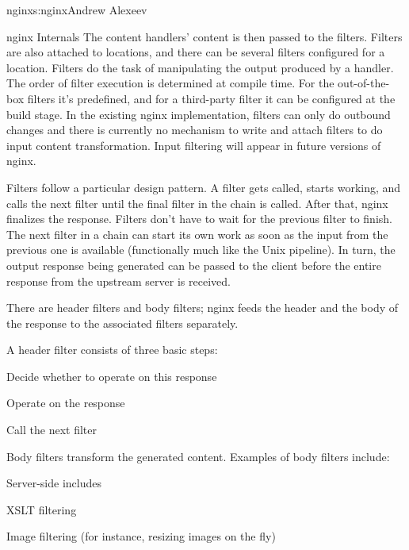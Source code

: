 \begin{aosachapter}{nginx}{s:nginx}{Andrew Alexeev}
\begin{aosasect1}{nginx Internals}
The content handlers' content is then passed to the filters. Filters
are also attached to locations, and there can be several filters
configured for a location. Filters do the task of manipulating the
output produced by a handler. The order of filter execution is
determined at compile time. For the out-of-the-box filters it's
predefined, and for a third-party filter it can be configured at the
build stage. In the existing nginx implementation, filters can only do
outbound changes and there is currently no mechanism to write and
attach filters to do input content transformation. Input filtering
will appear in future versions of nginx.

Filters follow a particular design pattern. A filter gets called,
starts working, and calls the next filter until the final filter in
the chain is called. After that, nginx finalizes the response. Filters
don't have to wait for the previous filter to finish. The next filter
in a chain can start its own work as soon as the input from the
previous one is available (functionally much like the Unix
pipeline). In turn, the output response being generated can be passed
to the client before the entire response from the upstream server is
received.

There are header filters and body filters; nginx feeds the header and
the body of the response to the associated filters separately.

A header filter consists of three basic steps:

\begin{aosaenumerate}

\item Decide whether to operate on this response

\item Operate on the response

\item Call the next filter

\end{aosaenumerate}

\noindent Body filters transform the generated content. Examples of body filters
include:

\begin{aosaitemize}

\item Server-side includes

\item XSLT filtering

\item Image filtering (for instance, resizing images on the fly)


\end{aosaitemize}
\end{aosasect1}
\end{aosachapter}
